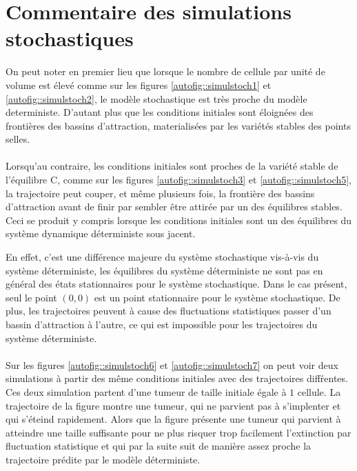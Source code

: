 \documentclass[12pt]{article}
\begin{document}
\section{Commentaire des simulations stochastiques}
On peut noter en premier lieu que lorsque le nombre de cellule par unit\'e de volume est \'elev\'e comme sur les figures \ref{autofig::simulstoch1} et \ref{autofig::simulstoch2}, le mod\`ele stochastique est tr\`es proche du mod\`ele deterministe. D'autant plus que les conditions initiales sont \'eloign\'ees des fronti\`eres des bassins d'attraction, materialis\'ees par les variétés stables des points selles.

\paragraph*{}
 Lorsqu'au contraire, les conditions initiales sont proches de la vari\'et\'e stable de l'\'equilibre C, comme sur les figures \ref{autofig::simulstoch3} et \ref{autofig::simulstoch5}, la trajectoire peut couper, et m\^eme plusieurs fois, la fronti\`ere des bassins d'attraction avant de finir par sembler \^etre attir\'ee par un des \'equilibres stables. Ceci se produit y compris lorsque les conditions initiales sont un des \'equilibres du syst\`eme dynamique d\'eterministe sous jacent. 

 En effet, c'est une diff\'erence majeure du syst\`eme stochastique vis-\`a-vis du syst\`eme d\'eterministe, les \'equilibres du syst\`eme d\'eterministe ne sont pas en g\'en\'eral des \'etats stationnaires pour le syst\`eme stochastique. Dans le cas pr\'esent, seul le point $(0,0)$ est un point stationnaire pour le syst\`eme stochastique. De plus, les trajectoires peuvent \`a cause des fluctuations statistiques passer d'un bassin d'attraction \`a l'autre, ce qui est impossible pour les trajectoires du syst\`eme d\'eterministe.

\paragraph{}
Sur les figures \ref{autofig::simulstoch6} et \ref{autofig::simulstoch7} on peut voir deux simulations \`a partir des m\^eme conditions initiales avec des trajectoires diff\'rentes. Ces deux simulation partent d'une tumeur de taille initiale \'egale \`a $1$ cellule. La trajectoire de la figure montre une tumeur, qui ne parvient pas \`a s'implenter et qui s'\'eteind rapidement. Alors que la figure pr\'esente une tumeur qui parvient \`a atteindre une taille suffisante pour ne plus risquer trop facilement l'extinction par fluctuation statistique et qui par la suite suit de mani\`ere assez proche la trajectoire pr\'edite par le mod\`ele d\'eterministe. 
\end{document}
